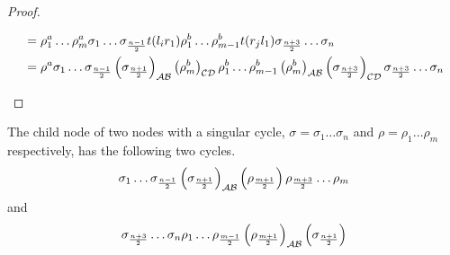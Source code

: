 \begin{proof}
\begin{enumerate}
\begin{align*}
                        & =
                  \rho^a_1 \dots \rho^a_m
                  \sigma_1 \dots \sigma_{\frac{n-1}{2}} t(l_i r_1)
                  \rho^b_1 \dots \rho^b_{m-1} t(r_j l_1)
                  \sigma_{\frac{n+3}{2}} \dots \sigma_n                                                                 \\
                        & =
                  \rho^a
                  \sigma_1 \dots \sigma_{\frac{n-1}{2}} \left(\sigma_{\frac{n+1}{2}}\right)_{\mathcal{A}\mathcal{B}} \left(\rho^b_m\right)_{\mathcal{C}\mathcal{D}}
                  \rho^b_1 \dots \rho^b_{m-1} \left(\rho^b_m\right)_{\mathcal{A}\mathcal{B}} \left(\sigma_{\frac{n+3}{2}}\right)_{\mathcal{C}\mathcal{D}}
                  \sigma_{\frac{n+3}{2}} \dots \sigma_n                                                                 \\
              \end{align*}
    \end{enumerate}
\end{proof}

\begin{theorem}
    The child node of two nodes with a singular cycle, $\sigma = \sigma_1 \dots \sigma_n$ and $\rho = \rho_1 \dots \rho_m$ respectively, has the following two cycles.
    \begin{align*}
        \sigma_1 \dots \sigma_{\frac{n-1}{2}} \left(\sigma_{\frac{n+1}{2}}\right)_{\mathcal{A}\mathcal{B}}
        \left(\rho_{\frac{m+1}{2}}\right) \rho_{\frac{m+3}{2}} \dots \rho_m
    \end{align*}
    and
    \begin{align*}
        \sigma_{\frac{n+3}{2}} \dots \sigma_n \rho_1 \dots \rho_{\frac{m-1}{2}}
        \left(\rho_{\frac{m+1}{2}}\right)_{\mathcal{A}\mathcal{B}} \left(\sigma_{\frac{n+1}{2}}\right)
    \end{align*}
\end{theorem}

